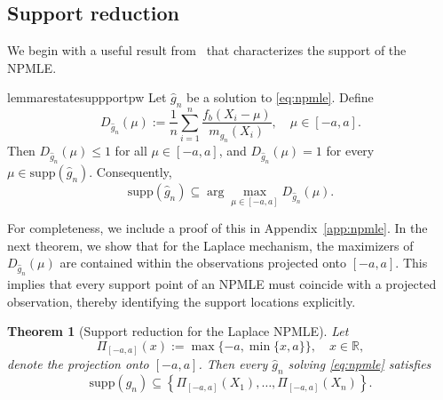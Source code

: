 \documentclass[english, 11pt]{article}
\newcommand{\supp}{\mathrm{supp}}
\theoremstyle{plain}
\newtheorem{theorem}{Theorem}[section]
\theoremstyle{definition}
\theoremstyle{remark}
\begin{document}
\subsection{Support reduction}

We begin with a useful result from~\cite{polyanskiy2020self} that characterizes the support of the NPMLE.
\begin{restatable}{lemma}{restatesuppportpw}\label{lem:support-characterization}
Let $\widehat g_n$ be a solution to \eqref{eq:npmle}. Define
\begin{equation*}
D_{\widehat g_n}(\mu):=\frac{1}{n}\sum_{i=1}^n \frac{f_b(X_i-\mu)}{m_{\widehat g_n}(X_i)}, \quad \mu\in[-a,a].
\end{equation*}
Then $D_{\widehat g_n}(\mu)\le 1$ for all $\mu\in[-a,a]$, and $D_{\widehat g_n}(\mu)=1$ for every $\mu\in \supp(\widehat g_n)$. 
Consequently,
\begin{equation*}
\supp(\widehat g_n)\subseteq \arg\max_{\mu\in[-a,a]} D_{\widehat g_n}(\mu).
\end{equation*}
\end{restatable}
For completeness, we include a proof of this in Appendix~\ref{app:npmle}. 
In the next theorem, we show that for the Laplace mechanism, the maximizers of $D_{\widehat g_n}(\mu)$ are contained within the observations projected onto $[-a,a]$.
This implies that every support point of an NPMLE must coincide with a projected observation, thereby identifying the support locations explicitly. 


\begin{theorem}[Support reduction for the Laplace NPMLE]\label{thm:laplace-support}
Let
\begin{equation*}
\Pi_{[-a,a]}(x):=\max\{-a,\min\{x,a\}\}, \quad x\in\mathbb R,
\end{equation*}
denote the projection onto $[-a,a]$. 
Then every $\widehat g_n$ solving \eqref{eq:npmle} satisfies
\begin{equation*}
\supp(\widehat g_n)\subseteq \left\{\Pi_{[-a,a]}(X_1),\dots,\Pi_{[-a,a]}(X_n)\right\}.
\end{equation*}
\end{theorem}
\end{document}
